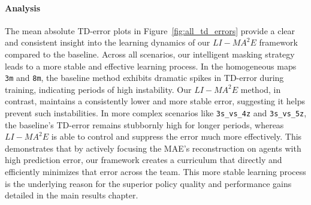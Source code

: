 \paragraph{Analysis}
The mean absolute TD-error plots in Figure~\ref{fig:all_td_errors} provide a clear and consistent insight into the learning dynamics of our $LI-MA^2E$ framework compared to the baseline. Across all scenarios, our intelligent masking strategy leads to a more stable and effective learning process. In the homogeneous maps \texttt{3m} and \texttt{8m}, the baseline method exhibits dramatic spikes in TD-error during training, indicating periods of high instability. Our $LI-MA^2E$ method, in contrast, maintains a consistently lower and more stable error, suggesting it helps prevent such instabilities. In more complex scenarios like \texttt{3s\_vs\_4z}  and \texttt{3s\_vs\_5z}, the baseline's TD-error remains stubbornly high for longer periods, whereas $LI-MA^2E$ is able to control and suppress the error much more effectively. This demonstrates that by actively focusing the MAE's reconstruction on agents with high prediction error, our framework creates a curriculum that directly and efficiently minimizes that error across the team. This more stable learning process is the underlying reason for the superior policy quality and performance gains detailed in the main results chapter.





